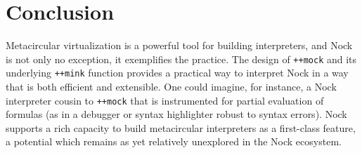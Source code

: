 \documentclass[twoside]{article}
\begin{document}
\section{Conclusion}

Metacircular virtualization is a powerful tool for building interpreters, and Nock is not only no exception, it exemplifies the practice.  The design of \lstinline[style=inlinecode]{++mock} and its underlying \lstinline[style=inlinecode]{++mink} function provides a practical way to interpret Nock in a way that is both efficient and extensible.  One could imagine, for instance, a Nock interpreter cousin to \lstinline[style=inlinecode]{++mock} that is instrumented for partial evaluation of formulas (as in a debugger or syntax highlighter robust to syntax errors).  Nock supports a rich capacity to build metacircular interpreters as a first-class feature, a potential which remains as yet relatively unexplored in the Nock ecosystem. \tombstone

\printbibliography
\end{document}
